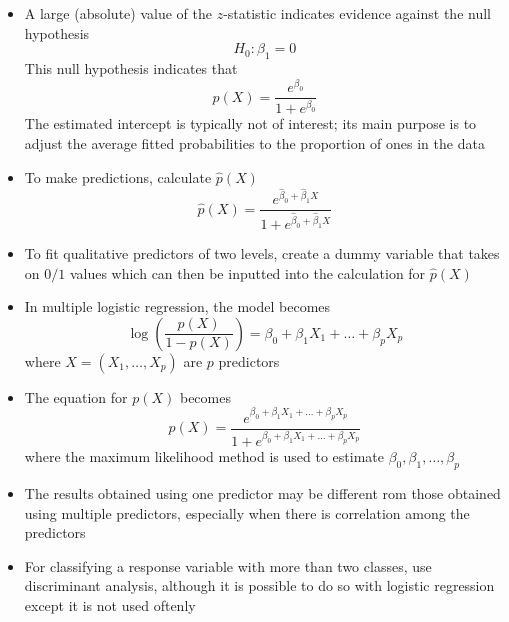 \documentclass[12pt]{article}
\begin{document}
\begin{itemize}
\item A large (absolute) value of the $z$-statistic indicates evidence against the null hypothesis $$ H_0: \beta_1 = 0$$ This null hypothesis indicates that $$ p(X) = \frac{e^{\beta_0}}{1 + e^{\beta_0}} $$ The estimated intercept is typically not of interest; its main purpose is to adjust the average fitted probabilities to the proportion of ones in the data 
\item To make predictions, calculate $\hat{p}(X)$ $$ \hat{p}(X) = \frac{e^{\hat{\beta}_0 + \hat{\beta}_1X}}{1 + e^{\hat{\beta}_0 + \hat{\beta}_1X}} $$ 
\item To fit qualitative predictors of two levels, create a dummy variable that takes on $0/1$ values which can then be inputted into the calculation for $\hat{p}(X)$
\item In multiple logistic regression, the model becomes $$ \log \left( \frac{p(X)}{1-p(X)} \right) = \beta_0 + \beta_1X_1 + \dots + \beta_pX_p $$ where $X = (X_1,\dots,X_p)$ are $p$ predictors
\item The equation for $p(X)$ becomes $$ p(X) = \frac{e^{\beta_0 + \beta_1X_1 + \dots + \beta_pX_p}}{1 + e^{\beta_0 + \beta_1X_1 + \dots + \beta_pX_p}} $$ where the maximum likelihood method is used to estimate $\beta_0,\beta_1,\dots,\beta_p$
\item The results obtained using one predictor may be different rom those obtained using multiple predictors, especially when there is correlation among the predictors
\item For classifying a response variable with more than two classes, use discriminant analysis, although it is possible to do so with logistic regression except it is not used oftenly
\end{itemize}
\end{document}

